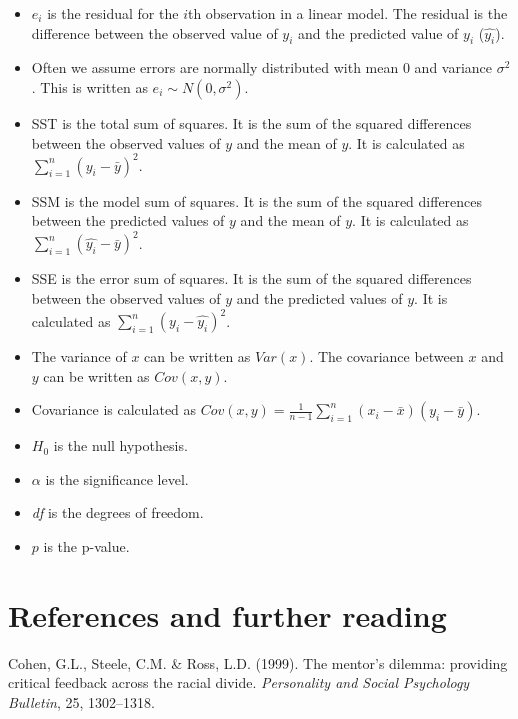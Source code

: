 \documentclass[
  letterpaper,
  8pt,
  a4paper]{book}
\begin{document}
\begin{itemize}
  \(\hat{y_i} = \hat{\beta}_0 + \hat{\beta}_1 x_i^{(1)}\).
\item
  \(e_i\) is the residual for the \(i\)th observation in a linear model.
  The residual is the difference between the observed value of \(y_i\)
  and the predicted value of \(y_i\) (\(\hat{y_i}\)).
\item
  Often we assume errors are normally distributed with mean 0 and
  variance \(\sigma^2\). This is written as \(e_i \sim N(0, \sigma^2)\).
\item
  SST is the total sum of squares. It is the sum of the squared
  differences between the observed values of \(y\) and the mean of
  \(y\). It is calculated as \(\sum_{i=1}^n (y_i - \bar{y})^2\).
\item
  SSM is the model sum of squares. It is the sum of the squared
  differences between the predicted values of \(y\) and the mean of
  \(y\). It is calculated as \(\sum_{i=1}^n (\hat{y_i} - \bar{y})^2\).
\item
  SSE is the error sum of squares. It is the sum of the squared
  differences between the observed values of \(y\) and the predicted
  values of \(y\). It is calculated as
  \(\sum_{i=1}^n (y_i - \hat{y_i})^2\).
\item
  The variance of \(x\) can be written as \(Var(x)\). The covariance
  between \(x\) and \(y\) can be written as \(Cov(x, y)\).
\item
  Covariance is calculated as
  \(Cov(x, y) = \frac{1}{n-1} \sum_{i=1}^n (x_i - \bar{x})(y_i - \bar{y})\).
\item
  \(H_0\) is the null hypothesis.
\item
  \(\alpha\) is the significance level.
\item
  \emph{df} is the degrees of freedom.
\item
  \(p\) is the p-value.
\end{itemize}

\section*{References and further
reading}\label{references-and-further-reading}


Cohen, G.L., Steele, C.M. \& Ross, L.D. (1999). The mentor's dilemma:
providing critical feedback across the racial divide. \emph{Personality
and Social Psychology Bulletin}, 25, 1302--1318.
\end{document}
